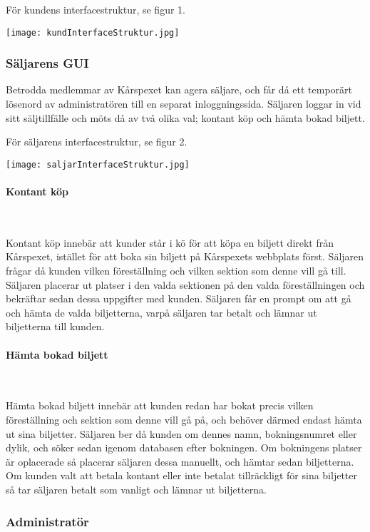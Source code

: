 \documentclass[a4paper, twoside, 11pt, titlepage]{article}
\begin{document}
		För kundens interfacestruktur, se figur 1.

		\texttt{[image: kundInterfaceStruktur.jpg]}

		\subsubsection{Säljarens GUI}


		Betrodda medlemmar av Kårspexet kan agera säljare, och får då ett temporärt lösenord av administratören till en separat inloggningssida. Säljaren loggar in vid sitt säljtillfälle och möts då av två olika val; kontant köp och hämta bokad biljett.

		För säljarens interfacestruktur, se figur 2.

		\texttt{[image: saljarInterfaceStruktur.jpg]}

			\paragraph{Kontant köp}\

			Kontant köp innebär att kunder står i kö för att köpa en biljett direkt från Kårspexet, istället för att boka sin biljett på Kårspexets webbplats först. Säljaren frågar då kunden vilken föreställning och vilken sektion som denne vill gå till. Säljaren placerar ut platser i den valda sektionen på den valda föreställningen och bekräftar sedan dessa uppgifter med kunden. Säljaren får en prompt om att gå och hämta de valda biljetterna, varpå säljaren tar betalt och lämnar ut biljetterna till kunden.

			\paragraph{Hämta bokad biljett}\

			Hämta bokad biljett innebär att kunden redan har bokat precis vilken föreställning och sektion som denne vill gå på, och behöver därmed endast hämta ut sina biljetter. Säljaren ber då kunden om dennes namn, bokningsnumret eller dylik, och söker sedan igenom databasen efter bokningen. Om bokningens platser är oplacerade så placerar säljaren dessa manuellt, och hämtar sedan biljetterna. Om kunden valt att betala kontant eller inte betalat tillräckligt för sina biljetter så tar säljaren betalt som vanligt och lämnar ut biljetterna.

		\subsubsection{Administratör}
\end{document}
